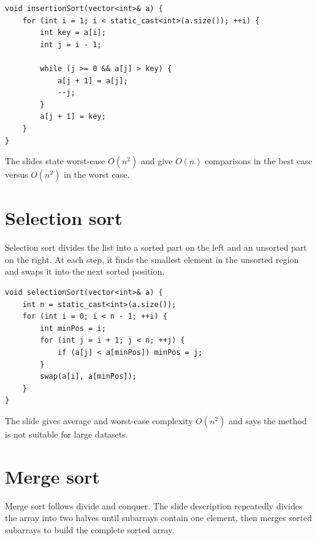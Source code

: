 \begin{lstlisting}
void insertionSort(vector<int>& a) {
    for (int i = 1; i < static_cast<int>(a.size()); ++i) {
        int key = a[i];
        int j = i - 1;

        while (j >= 0 && a[j] > key) {
            a[j + 1] = a[j];
            --j;
        }
        a[j + 1] = key;
    }
}
\end{lstlisting}

The slides state worst-case $O(n^2)$ and give $O(n)$ comparisons in the best case versus $O(n^2)$ in the worst case.

\section{Selection sort}

Selection sort divides the list into a sorted part on the left and an unsorted part on the right. At each step, it finds the smallest element in the unsorted region and swaps it into the next sorted position.

\begin{lstlisting}
void selectionSort(vector<int>& a) {
    int n = static_cast<int>(a.size());
    for (int i = 0; i < n - 1; ++i) {
        int minPos = i;
        for (int j = i + 1; j < n; ++j) {
            if (a[j] < a[minPos]) minPos = j;
        }
        swap(a[i], a[minPos]);
    }
}
\end{lstlisting}

The slide gives average and worst-case complexity $O(n^2)$ and says the method is not suitable for large datasets.

\section{Merge sort}

Merge sort follows divide and conquer. The slide description repeatedly divides the array into two halves until subarrays contain one element, then merges sorted subarrays to build the complete sorted array.

\begin{mlfigure}
\end{mlfigure}

